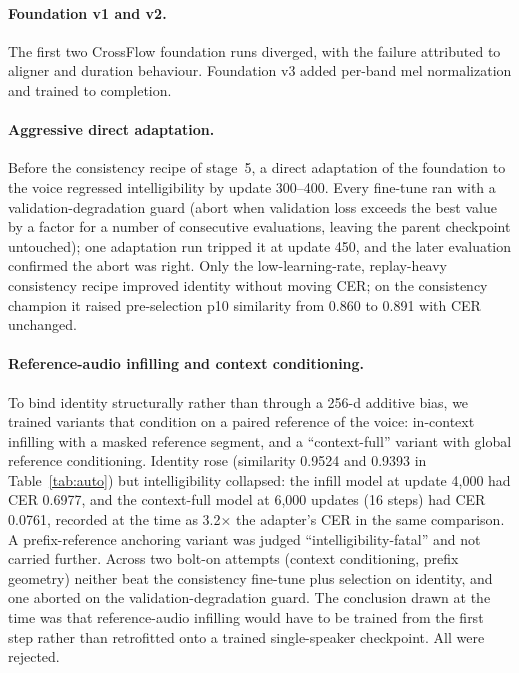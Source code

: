 \documentclass[10pt,twocolumn]{article}
\begin{document}
\paragraph{Foundation v1 and v2.} The first two CrossFlow foundation runs diverged, with the failure attributed to aligner and duration behaviour. Foundation v3 added per-band mel normalization and trained to completion.

\paragraph{Aggressive direct adaptation.} Before the consistency recipe of stage~5, a direct adaptation of the foundation to the voice regressed intelligibility by update 300--400. Every fine-tune ran with a validation-degradation guard (abort when validation loss exceeds the best value by a factor for a number of consecutive evaluations, leaving the parent checkpoint untouched); one adaptation run tripped it at update 450, and the later evaluation confirmed the abort was right. Only the low-learning-rate, replay-heavy consistency recipe improved identity without moving CER; on the consistency champion it raised pre-selection p10 similarity from 0.860 to 0.891 with CER unchanged.

\paragraph{Reference-audio infilling and context conditioning.} To bind identity structurally rather than through a 256-d additive bias, we trained variants that condition on a paired reference of the voice: in-context infilling with a masked reference segment, and a ``context-full'' variant with global reference conditioning. Identity rose (similarity 0.9524 and 0.9393 in Table~\ref{tab:auto}) but intelligibility collapsed: the infill model at update 4,000 had CER 0.6977, and the context-full model at 6,000 updates (16 steps) had CER 0.0761, recorded at the time as 3.2$\times$ the adapter's CER in the same comparison. A prefix-reference anchoring variant was judged ``intelligibility-fatal'' and not carried further. Across two bolt-on attempts (context conditioning, prefix geometry) neither beat the consistency fine-tune plus selection on identity, and one aborted on the validation-degradation guard. The conclusion drawn at the time was that reference-audio infilling would have to be trained from the first step rather than retrofitted onto a trained single-speaker checkpoint. All were rejected.
\end{document}
